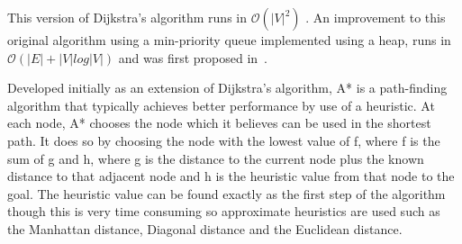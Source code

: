 This version of Dijkstra's algorithm runs in $\mathcal{O}(|V|^{2})$ 
\cite{xu2007improved}. An improvement to this original algorithm using a 
min-priority queue implemented using a heap, runs in $\mathcal{O}
(|E| + |V|log |V|)$ and was first proposed in~\cite{fredman1987fibonacci}.


Developed initially as an extension of Dijkstra's algorithm, A* is a 
path-finding algorithm that typically achieves better performance by 
use of a heuristic. At each node, A* chooses the node which it believes 
can be used in the shortest path. It does so by choosing the node with 
the lowest value of f, where f is the sum of g and h, where g is the 
distance to the current node plus the known distance to that adjacent 
node and h is the heuristic value from that node to the goal. The heuristic 
value can be found exactly as the first step of the algorithm though 
this is very time consuming so approximate heuristics are used such 
as the Manhattan distance, Diagonal distance and the Euclidean distance. 
